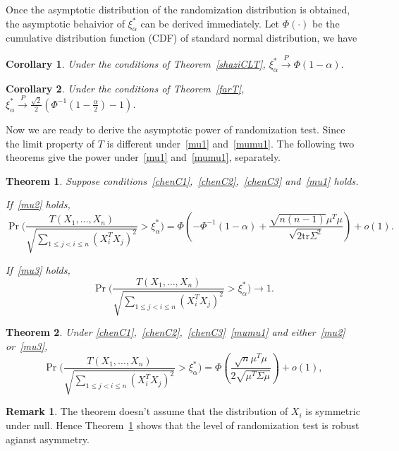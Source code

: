 \documentclass[review]{elsarticle}
\theoremstyle{plain}
\newtheorem{theorem}{\quad\quad Theorem}
\newtheorem{corollary}{\quad\quad Corollary}
\theoremstyle{definition}
\newtheorem{remark}{\quad\quad Remark}
\theoremstyle{remark}
\begin{document}
Once the asymptotic distribution of the randomization distribution is obtained, the asymptotic behaivior of $\xi_{\alpha}^*$ can be derived immediately.
Let $\Phi(\cdot)$ be the cumulative distribution function (CDF) of standard normal distribution, we have
\begin{corollary}\label{corollaryQuan}
    Under the conditions of Theorem~\ref{shaziCLT}, $\xi_{\alpha}^*\xrightarrow{P} \Phi(1-\alpha)$.
\end{corollary}

\begin{corollary}\label{corollaryQuan2}
    Under the conditions of Theorem~\ref{farT},
    $\xi_{\alpha}^*\xrightarrow{P}\frac{\sqrt{2}}{2}(\Phi^{-1}(1-\frac{\alpha}{2})-1)$.
\end{corollary}


Now we are ready to derive the asymptotic power of randomization test.
Since the limit property of $T$ is different under~\eqref{mu1} and~\eqref{mumu1}.
The following two theorems give the power under~\eqref{mu1} and~\eqref{mumu1}, separately.

\begin{theorem}\label{theoremPower}
    Suppose conditions~\eqref{chenC1},~\eqref{chenC2},~\eqref{chenC3} and~\eqref{mu1} holds.

    If~\eqref{mu2} holds,
    \begin{equation*}
            \Pr\Big(\frac{T( X_1,\ldots, X_n)}{\sqrt{\sum_{1\leq j<i\leq n}{(X_i^T X_j)}^2}}>\xi_{\alpha}^* \Big)
            =
            \Phi(-\Phi^{-1}(1-\alpha)+\frac{\sqrt{n(n-1)}\mu^T\mu}{\sqrt{2\mathrm{tr}\Sigma^2}})+o(1).
    \end{equation*}

    If~\eqref{mu3} holds,
    \begin{equation*}
            \Pr\Big(\frac{T( X_1,\ldots, X_n)}{\sqrt{\sum_{1\leq j<i\leq n}{(X_i^T X_j)}^2}}>\xi_{\alpha}^* \Big)\to 1.
    \end{equation*}
\end{theorem}

\begin{theorem}\label{theoremPower2}
    Under \eqref{chenC1},~\eqref{chenC2},~\eqref{chenC3}~\eqref{mumu1} and either~\eqref{mu2} or~\eqref{mu3},
    \begin{equation*}
            \Pr\Big(\frac{T( X_1,\ldots, X_n)}{\sqrt{\sum_{1\leq j<i\leq n}{(X_i^T X_j)}^2}}>\xi_{\alpha}^* \Big)
            =
            \Phi(\frac{\sqrt{n}\mu^T\mu}{2\sqrt{\mu^T \Sigma \mu}})+o(1),
    \end{equation*}
\end{theorem}
\begin{remark}
    The theorem doesn't assume that the distribution of $X_i$ is symmetric under null. Hence Theorem~\ref{theoremPower} shows that the level of randomization test is robust agianst asymmetry.
\end{remark}
\end{document}
